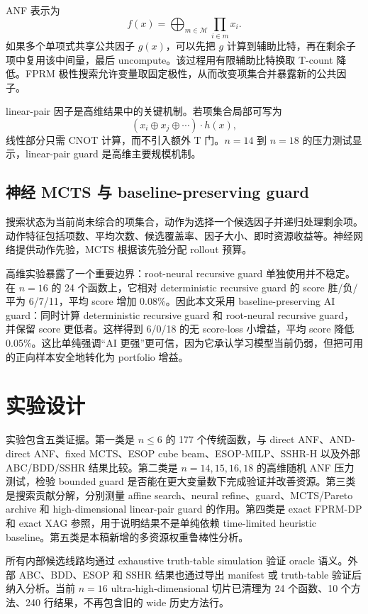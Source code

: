 \documentclass[UTF8,fontset=macnew,11pt]{ctexart}
\begin{document}
ANF 表示为
\begin{equation}
  f(x)=\bigoplus_{m\in\mathcal{M}}\prod_{i\in m}x_i .
\end{equation}
如果多个单项式共享公共因子 $g(x)$，可以先把 $g$ 计算到辅助比特，再在剩余子项中复用该中间量，最后 uncompute。该过程用有限辅助比特换取 T-count 降低。FPRM 极性搜索允许变量取固定极性，从而改变项集合并暴露新的公共因子。

linear-pair 因子是高维结果中的关键机制。若项集合局部可写为
\[
  (x_i\oplus x_j\oplus\cdots)\cdot h(x),
\]
线性部分只需 CNOT 计算，而不引入额外 T 门。$n=14$ 到 $n=18$ 的压力测试显示，linear-pair guard 是高维主要规模机制。

\subsection{神经 MCTS 与 baseline-preserving guard}

搜索状态为当前尚未综合的项集合，动作为选择一个候选因子并递归处理剩余项。动作特征包括项数、平均次数、候选覆盖率、因子大小、即时资源收益等。神经网络提供动作先验，MCTS 根据该先验分配 rollout 预算。

高维实验暴露了一个重要边界：root-neural recursive guard 单独使用并不稳定。在 $n=16$ 的 24 个函数上，它相对 deterministic recursive guard 的 score 胜/负/平为 6/7/11，平均 score 增加 0.08\%。因此本文采用 baseline-preserving AI guard：同时计算 deterministic recursive guard 和 root-neural recursive guard，并保留 score 更低者。这样得到 6/0/18 的无 score-loss 小增益，平均 score 降低 0.05\%。这比单纯强调“AI 更强”更可信，因为它承认学习模型当前仍弱，但把可用的正向样本安全地转化为 portfolio 增益。

\section{实验设计}

实验包含五类证据。第一类是 $n\leq6$ 的 177 个传统函数，与 direct ANF、AND-direct ANF、fixed MCTS、ESOP cube beam、ESOP-MILP、SSHR-H 以及外部 ABC/BDD/SSHR 结果比较。第二类是 $n=14,15,16,18$ 的高维随机 ANF 压力测试，检验 bounded guard 是否能在更大变量数下完成验证并改善资源。第三类是搜索贡献分解，分别测量 affine search、neural refine、guard、MCTS/Pareto archive 和 high-dimensional linear-pair guard 的作用。第四类是 exact FPRM-DP 和 exact XAG 参照，用于说明结果不是单纯依赖 time-limited heuristic baseline。第五类是本稿新增的多资源权重鲁棒性分析。

所有内部候选线路均通过 exhaustive truth-table simulation 验证 oracle 语义。外部 ABC、BDD、ESOP 和 SSHR 结果也通过导出 manifest 或 truth-table 验证后纳入分析。当前 $n=16$ ultra-high-dimensional 切片已清理为 24 个函数、10 个方法、240 行结果，不再包含旧的 wide 历史方法行。
\end{document}

